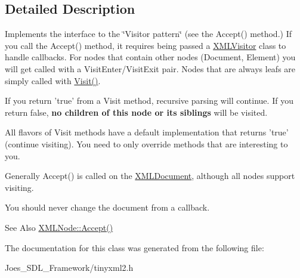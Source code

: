 \subsection{Detailed Description}
Implements the interface to the \char`\"{}\-Visitor pattern\char`\"{} (see the Accept() method.) If you call the Accept() method, it requires being passed a \hyperlink{classtinyxml2_1_1_x_m_l_visitor}{X\-M\-L\-Visitor} class to handle callbacks. For nodes that contain other nodes (Document, Element) you will get called with a Visit\-Enter/\-Visit\-Exit pair. Nodes that are always leafs are simply called with \hyperlink{classtinyxml2_1_1_x_m_l_visitor_adc75bd459fc7ba8223b50f0616767f9a}{Visit()}.

If you return 'true' from a Visit method, recursive parsing will continue. If you return false, {\bfseries no children of this node or its siblings} will be visited.

All flavors of Visit methods have a default implementation that returns 'true' (continue visiting). You need to only override methods that are interesting to you.

Generally Accept() is called on the \hyperlink{classtinyxml2_1_1_x_m_l_document}{X\-M\-L\-Document}, although all nodes support visiting.

You should never change the document from a callback.

\begin{DoxySeeAlso}{See Also}
\hyperlink{classtinyxml2_1_1_x_m_l_node_a81e66df0a44c67a7af17f3b77a152785}{X\-M\-L\-Node\-::\-Accept()} 
\end{DoxySeeAlso}


The documentation for this class was generated from the following file\-:\begin{DoxyCompactItemize}
\item 
Joes\-\_\-\-S\-D\-L\-\_\-\-Framework/tinyxml2.\-h\end{DoxyCompactItemize}
